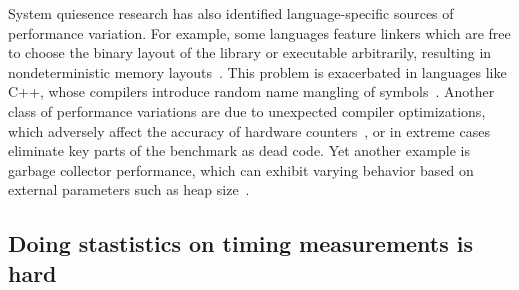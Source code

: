 \documentclass[conference]{IEEEtran}
\begin{document}
System quiesence research has also identified language-specific sources of performance
variation. For example, some languages feature linkers which are free to choose the binary
layout of the library or executable arbitrarily, resulting in nondeterministic memory
layouts~\cite{Georges2008}. This problem is exacerbated in languages like C++, whose
compilers introduce random name mangling of symbols~\cite{Kalibera2005}. Another class of
performance variations are due to unexpected compiler optimizations, which adversely affect
the accuracy of hardware counters~\cite{Zaparanuks2009}, or in extreme cases eliminate key
parts of the benchmark as dead code. Yet another example is garbage collector performance,
which can exhibit varying behavior based on external parameters such as heap
size~\cite{Blackburn2004}.

\label{sec:toughstats}
\subsection{Doing stastistics on timing measurements is hard}
\end{document}
